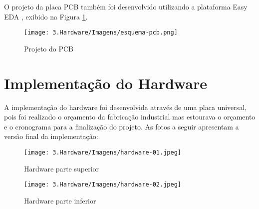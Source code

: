 O projeto da placa PCB também foi desenvolvido utilizando a plataforma Easy EDA \cite{site:easyeda}, exibido na Figura \ref{figura:esquema_pcb}.

\begin{figure}[H]
\captionsetup{width=\textwidth}%
\caption{ Projeto do PCB }%
\label{figura:esquema_pcb}%
\texttt{[image: 3.Hardware/Imagens/esquema-pcb.png]}%
\end{figure}

\section{Implementação do Hardware}

A implementação do hardware foi desenvolvida através de uma placa universal, pois foi realizado o orçamento da fabricação industrial mas estourava o orçamento e o cronograma para a finalização do projeto.
As fotos a seguir apresentam a versão final da implementação:

\begin{figure}[H]
\captionsetup{width=\textwidth}%
\caption{ Hardware parte superior }%
\label{figura:hardware_superior}%
\texttt{[image: 3.Hardware/Imagens/hardware-01.jpeg]}%
\end{figure}


\begin{figure}[H]
\captionsetup{width=\textwidth}%
\caption{ Hardware parte inferior }%
\label{figura:hardware_inferior}%
\texttt{[image: 3.Hardware/Imagens/hardware-02.jpeg]}%
\end{figure}